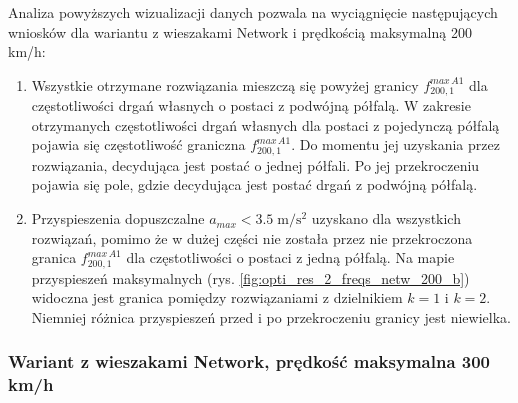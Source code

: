 Analiza powyższych wizualizacji danych pozwala na wyciągnięcie następujących wniosków dla wariantu z wieszakami Network i prędkością maksymalną 200 km/h:
\begin{enumerate}
	
	\item Wszystkie otrzymane rozwiązania mieszczą się powyżej granicy $f_{200,1}^{max\,A1}$ dla częstotliwości drgań własnych o postaci z podwójną półfalą. W zakresie otrzymanych częstotliwości drgań własnych dla postaci z pojedynczą półfalą pojawia się częstotliwość graniczna $f_{200,1}^{max\,A1}$. Do momentu jej uzyskania przez rozwiązania, decydująca jest postać o jednej półfali. Po jej przekroczeniu pojawia się pole, gdzie decydująca jest postać drgań z podwójną półfalą.
	\item Przyspieszenia dopuszczalne $a_{max}<3.5\;\mathrm{m/s^2}$ uzyskano dla wszystkich rozwiązań, pomimo że w dużej części nie została przez nie przekroczona granica $f_{200,1}^{max\,A1}$ dla częstotliwości o postaci z jedną półfalą. Na mapie przyspieszeń maksymalnych (rys. \ref{fig:opti_res_2_freqs_netw_200_b}) widoczna jest granica pomiędzy rozwiązaniami z dzielnikiem $k=1$ i $k=2$. Niemniej różnica przyspieszeń przed i po przekroczeniu granicy jest niewielka.
	
\end{enumerate}

\subsubsection{Wariant z wieszakami Network, prędkość maksymalna 300 km/h}

